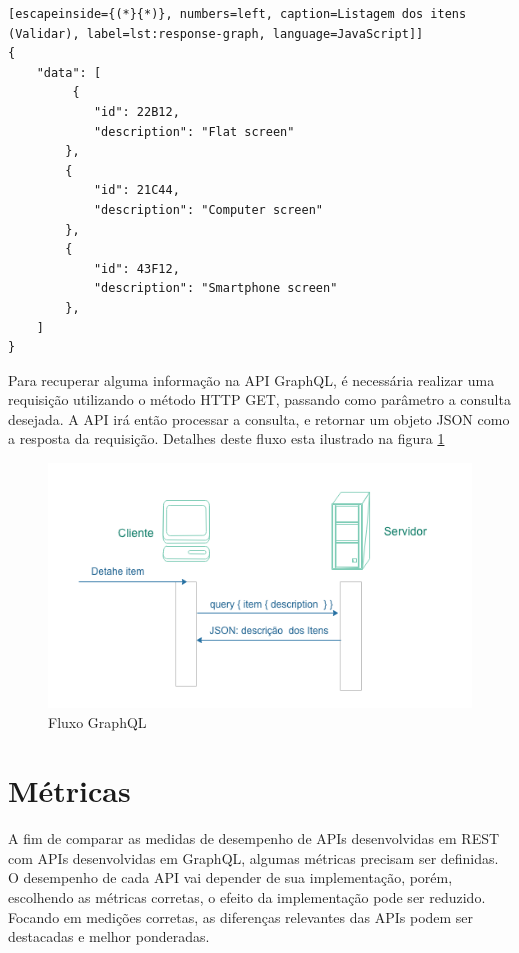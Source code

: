 \begin{lstlisting}[escapeinside={(*}{*)}, numbers=left, caption=Listagem dos itens (Validar), label=lst:response-graph, language=JavaScript]]
{
    "data": [
         {
        	"id": 22B12,
            "description": "Flat screen"
        },
        {
        	"id": 21C44,
            "description": "Computer screen"
        },
        {
        	"id": 43F12,
            "description": "Smartphone screen"
        },
    ]
}

\end{lstlisting}

Para recuperar alguma informação na API GraphQL, é necessária realizar uma requisição utilizando o método HTTP GET, passando como parâmetro a consulta desejada. A API irá então processar a consulta, e retornar um objeto JSON como a resposta da requisição. Detalhes deste fluxo esta ilustrado na figura \ref{fig:graph-uml}

\begin{figure}[htbp]
\centering
\includegraphics[width=1\textwidth]{figuras/uml-graph.png}
\caption{Fluxo GraphQL}
\label{fig:graph-uml}
\author{fonte: Autor}
\end{figure}

\section{Métricas}\label{sec:metrics}

A fim de comparar as medidas de desempenho de APIs desenvolvidas em REST com APIs desenvolvidas em GraphQL, algumas métricas precisam ser definidas. O desempenho de cada API vai depender de sua implementação, porém, escolhendo as métricas corretas, o efeito da implementação pode ser reduzido. Focando em medições corretas, as diferenças relevantes das APIs podem ser destacadas e melhor ponderadas.

